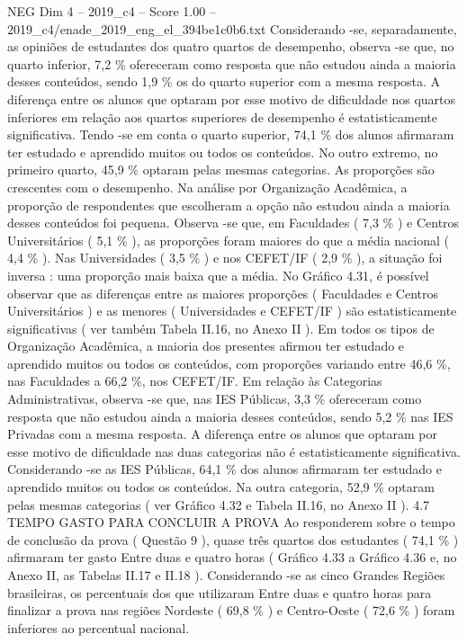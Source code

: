 \begin{textsample}{NEG Dim 4 – 2019\_c4 – Score 1.00 – 2019\_c4/enade\_2019\_eng\_el\_394be1c0b6.txt}
Considerando -se, separadamente, as opiniões de estudantes dos quatro quartos de desempenho, observa -se que, no quarto inferior, 7,2 \% ofereceram como resposta que não estudou ainda a maioria desses conteúdos, sendo 1,9 \% os do quarto superior com a mesma resposta.
A diferença entre os alunos que optaram por esse motivo de dificuldade nos quartos inferiores em relação aos quartos superiores de desempenho é estatisticamente significativa.
Tendo -se em conta o quarto superior, 74,1 \% dos alunos afirmaram ter estudado e aprendido muitos ou todos os conteúdos.
No outro extremo, no primeiro quarto, 45,9 \% optaram pelas mesmas categorias.
As proporções são crescentes com o desempenho.
Na análise por Organização Acadêmica, a proporção de respondentes que escolheram a opção não estudou ainda a maioria desses conteúdos foi pequena.
Observa -se que, em Faculdades ( 7,3 \% ) e Centros Universitários ( 5,1 \% ), as proporções foram maiores do que a média nacional ( 4,4 \% ).
Nas Universidades ( 3,5 \% ) e nos CEFET/IF ( 2,9 \% ), a situação foi inversa : uma proporção mais baixa que a média.
No Gráfico 4.31, é possível observar que as diferenças entre as maiores proporções ( Faculdades e Centros Universitários ) e as menores ( Universidades e CEFET/IF ) são estatisticamente significativas ( ver também Tabela II.16, no Anexo II ).
Em todos os tipos de Organização Acadêmica, a maioria dos presentes afirmou ter estudado e aprendido muitos ou todos os conteúdos, com proporções variando entre 46,6 \%, nas Faculdades a 66,2 \%, nos CEFET/IF.
Em relação às Categorias Administrativas, observa -se que, nas IES Públicas, 3,3 \% ofereceram como resposta que não estudou ainda a maioria desses conteúdos, sendo 5,2 \% nas IES Privadas com a mesma resposta.
A diferença entre os alunos que optaram por esse motivo de dificuldade nas duas categorias não é estatisticamente significativa.
Considerando -se as IES Públicas, 64,1 \% dos alunos afirmaram ter estudado e aprendido muitos ou todos os conteúdos.
Na outra categoria, 52,9 \% optaram pelas mesmas categorias ( ver Gráfico 4.32 e Tabela II.16, no Anexo II ). 4.7 TEMPO GASTO PARA CONCLUIR A PROVA Ao responderem sobre o tempo de conclusão da prova ( Questão 9 ), quase três quartos dos estudantes ( 74,1 \% ) afirmaram ter gasto Entre duas e quatro horas ( Gráfico 4.33 a Gráfico 4.36 e, no Anexo II, as Tabelas II.17 e II.18 ).
Considerando -se as cinco Grandes Regiões brasileiras, os percentuais dos que utilizaram Entre duas e quatro horas para finalizar a prova nas regiões Nordeste ( 69,8 \% ) e Centro-Oeste ( 72,6 \% ) foram inferiores ao percentual nacional.

\end{textsample}
